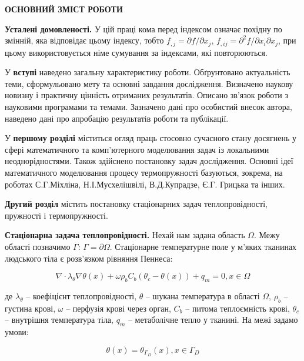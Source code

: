 \begin{center}
    \textbf{ОСНОВНИЙ ЗМІСТ РОБОТИ}
\end{center}

\textbf{Усталені домовленості.} У цій праці кома перед індексом означає похідну по змінній, яка відповідає цьому
індексу, тобто ${f_{,j} = \partial}{f/\partial}x_{j}$, ${{f_{,ij} = \partial^{2}}{f/\partial}x_{i}\partial x_{j}}{}$,
при цьому використовується німе сумування за індексами, які повторюються.

У \textbf{вступі} наведено загальну характеристику роботи. Обґрунтовано актуальність теми, сформульовано мету та основні
завдання дослідження. Визначено наукову новизну і практичну цінність отриманих результатів. Описано зв'язок роботи з
науковими програмами та темами. Зазначено дані про особистий внесок автора, наведено дані про апробацію результатів
роботи та публікації.

У \textbf{першому розділі} міститься огляд праць стосовно сучасного стану досягнень у сфері математичного та
комп'ютерного моделювання задач із локальними неоднорідностями. Також здійснено постановку задач дослідження. Основні
ідеї математичного моделювання процесу термопружності базуються, зокрема, на роботах С.Г.Міхліна, Н.І.Мусхелішвілі,
В.Д.Купрадзе, Є.Г. Грицька та інших.

\textbf{Другий розділ} містить постановку стаціонарних задач теплопровідності, пружності і термопружності.

\textbf{Стаціонарна задача теплопровідності.} Нехай нам задана область $\Omega$. Межу області позначимо $\Gamma$:
$\Gamma = \partial \Omega$. Стаціонарне температурне поле у м'яких тканинах людського тіла є розв'язком рівняння
Пеннеса:

\begin{equation}
    \label{eqn:theory_thermo_pennes_eqn}
    \nabla \cdot \lambda_\theta \nabla \theta(x) + \omega \rho_b C_b (\theta_c - \theta(x)) + q_m  = 0, x \in \Omega
\end{equation}

\noindent де $\lambda_\theta$ -- коефіцієнт теплопровідності, $\theta$ -- шукана температура в області $\Omega$, 
$\rho_b$ -- густина крові, $\omega$ -- перфузія крові через орган, $C_b$ -- питома теплоємність крові, 
$\theta_c$ -- внутрішня температура тіла, $q_m$ -- метаболічне тепло у тканині. На межі задамо умови:

\begin{equation}
    \label{eqn:theory_thermo_cond_dirichlet}
    \theta(x) = \theta_{\Gamma_D}(x), x \in \Gamma_D 
\end{equation}

